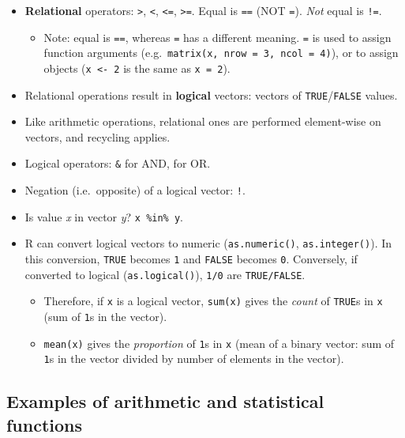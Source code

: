 \documentclass[
]{book}
\providecommand{\tightlist}{%
  \setlength{\itemsep}{0pt}\setlength{\parskip}{0pt}}
\begin{document}
\begin{itemize}
\tightlist
\item
  \textbf{Relational} operators: \texttt{\textgreater{}}, \texttt{\textless{}}, \texttt{\textless{}=}, \texttt{\textgreater{}=}. Equal is \texttt{==} (NOT \texttt{=}). \emph{Not} equal is \texttt{!=}.

  \begin{itemize}
  \tightlist
  \item
    Note: equal is \texttt{==}, whereas \texttt{=} has a different meaning. \texttt{=} is used to assign function arguments (e.g.~\texttt{matrix(x,\ nrow\ =\ 3,\ ncol\ =\ 4)}), or to assign objects (\texttt{x\ \textless{}-\ 2} is the same as \texttt{x\ =\ 2}).
  \end{itemize}
\item
  Relational operations result in \textbf{logical} vectors: vectors of \texttt{TRUE}/\texttt{FALSE} values.
\item
  Like arithmetic operations, relational ones are performed element-wise on vectors, and recycling applies.
\item
  Logical operators: \texttt{\&} for AND, \texttt{\textbar{}} for OR.
\item
  Negation (i.e.~opposite) of a logical vector: \texttt{!}.
\item
  Is value \emph{x} in vector \emph{y}? \texttt{x\ \%in\%\ y}.
\item
  R can convert logical vectors to numeric (\texttt{as.numeric()}, \texttt{as.integer()}). In this conversion, \texttt{TRUE} becomes \texttt{1} and \texttt{FALSE} becomes \texttt{0}. Conversely, if converted to logical (\texttt{as.logical()}), \texttt{1/0} are \texttt{TRUE/FALSE}.

  \begin{itemize}
  \tightlist
  \item
    Therefore, if \texttt{x} is a logical vector, \texttt{sum(x)} gives the \emph{count} of \texttt{TRUE}s in \texttt{x} (sum of \texttt{1}s in the vector).
  \item
    \texttt{mean(x)} gives the \emph{proportion} of \texttt{1}s in \texttt{x} (mean of a binary vector: sum of \texttt{1}s in the vector divided by number of elements in the vector).
  \end{itemize}
\end{itemize}

\hypertarget{examples-of-arithmetic-and-statistical-functions}{%
\subsection{Examples of arithmetic and statistical functions}\label{examples-of-arithmetic-and-statistical-functions}}
\end{document}
